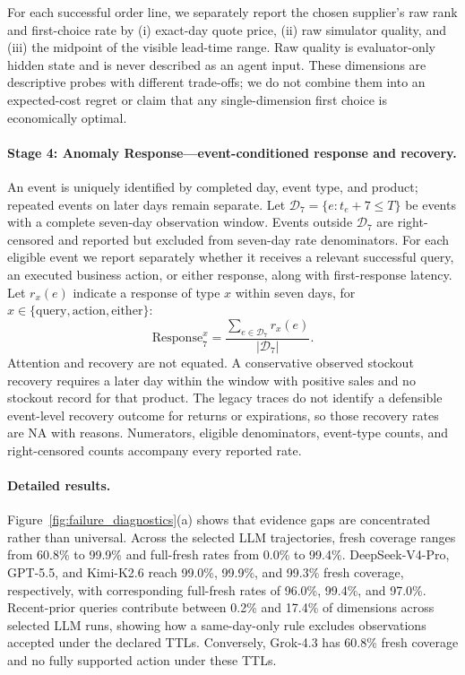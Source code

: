 For each successful order line, we separately report the chosen supplier's raw rank and first-choice rate by (i) exact-day quote price, (ii) raw simulator quality, and (iii) the midpoint of the visible lead-time range. Raw quality is evaluator-only hidden state and is never described as an agent input. These dimensions are descriptive probes with different trade-offs; we do not combine them into an expected-cost regret or claim that any single-dimension first choice is economically optimal.

\paragraph{Stage 4: Anomaly Response---event-conditioned response and recovery.}
An event is uniquely identified by completed day, event type, and product; repeated events on later days remain separate. Let $\mathcal{D}_7=\{e:t_e+7\leq T\}$ be events with a complete seven-day observation window. Events outside $\mathcal{D}_7$ are right-censored and reported but excluded from seven-day rate denominators. For each eligible event we report separately whether it receives a relevant successful query, an executed business action, or either response, along with first-response latency. Let $r_x(e)$ indicate a response of type $x$ within seven days, for $x\in\{\mathrm{query},\mathrm{action},\mathrm{either}\}$:
\begin{equation}
\mathrm{Response}^{x}_{7}
=\frac{\sum_{e\in\mathcal{D}_7}r_x(e)}{|\mathcal{D}_7|}.
\end{equation}
Attention and recovery are not equated. A conservative observed stockout recovery requires a later day within the window with positive sales and no stockout record for that product. The legacy traces do not identify a defensible event-level recovery outcome for returns or expirations, so those recovery rates are NA with reasons. Numerators, eligible denominators, event-type counts, and right-censored counts accompany every reported rate.

\paragraph{Detailed results.}
Figure~\ref{fig:failure_diagnostics}(a) shows that evidence gaps are concentrated rather than universal. Across the selected LLM trajectories, fresh coverage ranges from 60.8\% to 99.9\% and full-fresh rates from 0.0\% to 99.4\%. DeepSeek-V4-Pro, GPT-5.5, and Kimi-K2.6 reach 99.0\%, 99.9\%, and 99.3\% fresh coverage, respectively, with corresponding full-fresh rates of 96.0\%, 99.4\%, and 97.0\%. Recent-prior queries contribute between 0.2\% and 17.4\% of dimensions across selected LLM runs, showing how a same-day-only rule excludes observations accepted under the declared TTLs. Conversely, Grok-4.3 has 60.8\% fresh coverage and no fully supported action under these TTLs.

